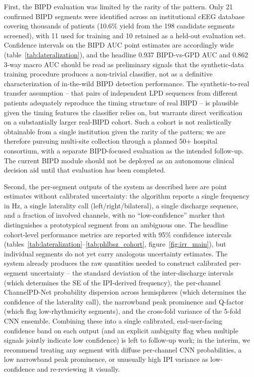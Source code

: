 \documentclass{iopjournal}
\begin{document}
First, the BIPD evaluation was limited by the rarity of the pattern. Only 21 confirmed BIPD segments were identified across an institutional cEEG database covering thousands of patients (10.6\% yield from the 198 candidate segments screened), with 11 used for training and 10 retained as a held-out evaluation set. Confidence intervals on the BIPD AUC point estimates are accordingly wide (table~\ref{tab:lateralization}), and the headline 0.937 BIPD-vs-GPD AUC and 0.862 3-way macro AUC should be read as preliminary signals that the synthetic-data training procedure produces a non-trivial classifier, not as a definitive characterization of in-the-wild BIPD detection performance. The synthetic-to-real transfer assumption -- that pairs of independent LPD sequences from different patients adequately reproduce the timing structure of real BIPD -- is plausible given the timing features the classifier relies on, but warrants direct verification on a substantially larger real-BIPD cohort. Such a cohort is not realistically obtainable from a single institution given the rarity of the pattern; we are therefore pursuing multi-site collection through a planned 50+ hospital consortium, with a separate BIPD-focused evaluation as the intended follow-up. The current BIPD module should not be deployed as an autonomous clinical decision aid until that evaluation has been completed.

Second, the per-segment outputs of the system as described here are point estimates without calibrated uncertainty: the algorithm reports a single frequency in Hz, a single laterality call (left/right/bilateral), a single discharge sequence, and a fraction of involved channels, with no ``low-confidence'' marker that distinguishes a prototypical segment from an ambiguous one. The headline cohort-level performance metrics are reported with 95\% confidence intervals (tables~\ref{tab:lateralization}--\ref{tab:phlbsz_cohort}, figure~\ref{fig:irr_main}), but individual segments do not yet carry analogous uncertainty estimates. The system already produces the raw quantities needed to construct calibrated per-segment uncertainty -- the standard deviation of the inter-discharge intervals (which determines the SE of the IPI-derived frequency), the per-channel ChannelPD-Net probability dispersion across hemispheres (which determines the confidence of the laterality call), the narrowband peak prominence and Q-factor (which flag low-rhythmicity segments), and the cross-fold variance of the 5-fold CNN ensemble. Combining these into a single calibrated, end-user-facing confidence band on each output (and an explicit ambiguity flag when multiple signals jointly indicate low confidence) is left to follow-up work; in the interim, we recommend treating any segment with diffuse per-channel CNN probabilities, a low narrowband peak prominence, or unusually high IPI variance as low-confidence and re-reviewing it visually.
\end{document}
